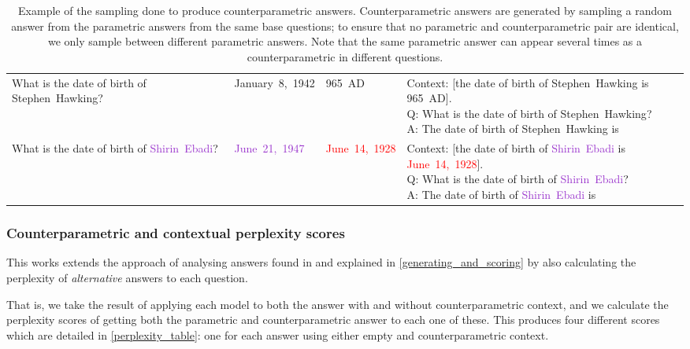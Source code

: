 \begin{table}
\begin{tabularx}{\textwidth}{>{\ttfamily}p{28ex} >{\ttfamily}l >{\ttfamily}l >{\ttfamily}X}
			What is the date of birth of \textcolor{Cerulean}{Stephen~Hawking}? &  \textcolor{Cerulean}{January~8,~1942} & \textcolor{Apricot}{965~AD} & \vwidth{Context: [the date of birth of \textcolor{Cerulean}{Stephen~Hawking} is \textcolor{Apricot}{965~AD}]. \\ Q: What is the date of birth of \textcolor{Cerulean}{Stephen~Hawking}? \\ A: The date of birth of \textcolor{Cerulean}{Stephen~Hawking} is} \vspace{4pt} \\
			What is the date of birth of \textcolor{DarkOrchid}{Shirin~Ebadi}? &  \textcolor{DarkOrchid}{June~21,~1947} & \textcolor{Red}{June~14,~1928} & \vwidth{Context: [the date of birth of \textcolor{DarkOrchid}{Shirin~Ebadi} is \textcolor{Red}{June~14,~1928}]. \\ Q: What is the date of birth of \textcolor{DarkOrchid}{Shirin~Ebadi}? \\ A: The date of birth of \textcolor{DarkOrchid}{Shirin~Ebadi} is} \vspace{2pt} \\
		\bottomrule
	\end{tabularx}
	\caption{Example of the sampling done to produce counterparametric answers. Counterparametric answers are generated by sampling a random answer from the parametric answers from the same base questions; to ensure that no parametric and counterparametric pair are identical, we only sample between different parametric answers. Note that the same parametric answer can appear several times as a counterparametric in different questions.}
	\label{sampling}
\end{table}

\subsubsection{Counterparametric and contextual perplexity scores}


This works extends the approach of analysing answers found in \citationneeded{} and explained in \cref{generating_and_scoring} by also calculating the perplexity of \emph{alternative} answers to each question.

That is, we take the result of applying each model to both the answer with and without counterparametric context, and we calculate the perplexity scores of getting both the parametric and counterparametric answer to each one of these.
This produces four different scores which are detailed in \cref{perplexity_table}: one for each answer using either empty and counterparametric context.

